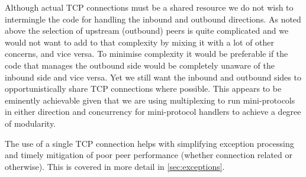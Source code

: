 Although actual TCP connections must be a shared resource we do not wish to
intermingle the code for handling the inbound and outbound directions. As noted
above the selection of upstream (outbound) peers is quite complicated and we
would not want to add to that complexity by mixing it with a lot of other
concerns, and vice versa.
To minimise complexity it would be preferable if the code that manages
the outbound side would be completely unaware of the inbound side and vice
versa. Yet we still want the inbound and outbound sides to opportunistically
share TCP connections where possible. This appears to be eminently achievable
given that we are using multiplexing to run mini-protocols in either direction
and concurrency for mini-protocol handlers to achieve a degree of modularity.

The use of a single TCP connection helps with simplifying exception processing
and timely mitigation of poor peer performance (whether connection related or
otherwise). This is covered in more detail in \cref{sec:exceptions}.

